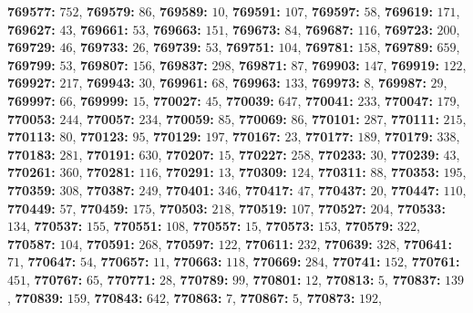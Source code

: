 \textsf{\bfseries 769577:} $752$, \textsf{\bfseries 769579:} $86$, \textsf{\bfseries 769589:} $10$, \textsf{\bfseries 769591:} $107$, \textsf{\bfseries 769597:} $58$, \textsf{\bfseries 769619:} $171$, \textsf{\bfseries 769627:} $43$, \textsf{\bfseries 769661:} $53$, \textsf{\bfseries 769663:} $151$, \textsf{\bfseries 769673:} $84$, \textsf{\bfseries 769687:} $116$, \textsf{\bfseries 769723:} $200$, \textsf{\bfseries 769729:} $46$, \textsf{\bfseries 769733:} $26$, \textsf{\bfseries 769739:} $53$, \textsf{\bfseries 769751:} $104$, \textsf{\bfseries 769781:} $158$, \textsf{\bfseries 769789:} $659$, \textsf{\bfseries 769799:} $53$, \textsf{\bfseries 769807:} $156$, \textsf{\bfseries 769837:} $298$, \textsf{\bfseries 769871:} $87$, \textsf{\bfseries 769903:} $147$, \textsf{\bfseries 769919:} $122$, \textsf{\bfseries 769927:} $217$, \textsf{\bfseries 769943:} $30$, \textsf{\bfseries 769961:} $68$, \textsf{\bfseries 769963:} $133$, \textsf{\bfseries 769973:} $8$, \textsf{\bfseries 769987:} $29$, \textsf{\bfseries 769997:} $66$, \textsf{\bfseries 769999:} $15$, \textsf{\bfseries 770027:} $45$, \textsf{\bfseries 770039:} $647$, \textsf{\bfseries 770041:} $233$, \textsf{\bfseries 770047:} $179$, \textsf{\bfseries 770053:} $244$, \textsf{\bfseries 770057:} $234$, \textsf{\bfseries 770059:} $85$, \textsf{\bfseries 770069:} $86$, \textsf{\bfseries 770101:} $287$, \textsf{\bfseries 770111:} $215$, \textsf{\bfseries 770113:} $80$, \textsf{\bfseries 770123:} $95$, \textsf{\bfseries 770129:} $197$, \textsf{\bfseries 770167:} $23$, \textsf{\bfseries 770177:} $189$, \textsf{\bfseries 770179:} $338$, \textsf{\bfseries 770183:} $281$, \textsf{\bfseries 770191:} $630$, \textsf{\bfseries 770207:} $15$, \textsf{\bfseries 770227:} $258$, \textsf{\bfseries 770233:} $30$, \textsf{\bfseries 770239:} $43$, \textsf{\bfseries 770261:} $360$, \textsf{\bfseries 770281:} $116$, \textsf{\bfseries 770291:} $13$, \textsf{\bfseries 770309:} $124$, \textsf{\bfseries 770311:} $88$, \textsf{\bfseries 770353:} $195$, \textsf{\bfseries 770359:} $308$, \textsf{\bfseries 770387:} $249$, \textsf{\bfseries 770401:} $346$, \textsf{\bfseries 770417:} $47$, \textsf{\bfseries 770437:} $20$, \textsf{\bfseries 770447:} $110$, \textsf{\bfseries 770449:} $57$, \textsf{\bfseries 770459:} $175$, \textsf{\bfseries 770503:} $218$, \textsf{\bfseries 770519:} $107$, \textsf{\bfseries 770527:} $204$, \textsf{\bfseries 770533:} $134$, \textsf{\bfseries 770537:} $155$, \textsf{\bfseries 770551:} $108$, \textsf{\bfseries 770557:} $15$, \textsf{\bfseries 770573:} $153$, \textsf{\bfseries 770579:} $322$, \textsf{\bfseries 770587:} $104$, \textsf{\bfseries 770591:} $268$, \textsf{\bfseries 770597:} $122$, \textsf{\bfseries 770611:} $232$, \textsf{\bfseries 770639:} $328$, \textsf{\bfseries 770641:} $71$, \textsf{\bfseries 770647:} $54$, \textsf{\bfseries 770657:} $11$, \textsf{\bfseries 770663:} $118$, \textsf{\bfseries 770669:} $284$, \textsf{\bfseries 770741:} $152$, \textsf{\bfseries 770761:} $451$, \textsf{\bfseries 770767:} $65$, \textsf{\bfseries 770771:} $28$, \textsf{\bfseries 770789:} $99$, \textsf{\bfseries 770801:} $12$, \textsf{\bfseries 770813:} $5$, \textsf{\bfseries 770837:} $139$, \textsf{\bfseries 770839:} $159$, \textsf{\bfseries 770843:} $642$, \textsf{\bfseries 770863:} $7$, \textsf{\bfseries 770867:} $5$, \textsf{\bfseries 770873:} $192$, 
